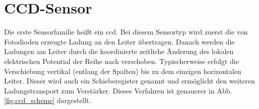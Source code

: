 \section{CCD-Sensor}
\label{text:ccd_theorie}
Die erste Sensorfamilie heißt ein \gls{ccd}. Bei diesem Sensortyp wird zuerst die von Fotodioden erzeugte Ladung an den Leiter übertragen. Danach werden die Ladungen am Leiter durch die koordinierte zeitliche Änderung des lokalen elektrischen Potential der Reihe nach verschoben. Typischerweise erfolgt die Verschiebung vertikal (entlang der Spalten) bis zu dem einzigen horizontalen Leiter. Dieser wird auch ein Schieberegister genannt und ermöglicht den weiteren Ladungstransport zum Verstärker. Dieses Verfahren ist genauerer in Abb. \ref{fig:ccd_scheme} dargestellt.
\begin{figure}[H]
    \centering

\end{figure}
